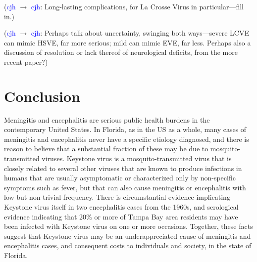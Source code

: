 \documentclass[12pt]{article}
\newcommand{\cjh}{\textcolor{blue}{cjh}}
\newcommand{\msg}[3]{(#1 $\rightarrow$ #2: #3)}
\newcommand{\mcc}[1]{\msg\cjh\cjh{#1}}
\begin{document}
            \mcc{Long-lasting complications, for La Crosse Virus in particular---fill in.}
            
            \mcc{Perhaps talk about uncertainty, swinging both ways---severe LCVE can mimic HSVE, far more serious; mild can mimic EVE, far less. Perhaps also a discussion of resolution or lack thereof of neurological deficits, from the more recent paper?}

    \section{Conclusion}
        \label{conclusion}
        Meningitis and encephalitis are serious public health burdens in the contemporary United States. In Florida, as in the US as a whole, many cases of meningitis and encephalitis never have a specific etiology diagnosed, and there is reason to believe that a substantial fraction of these may be due to mosquito-transmitted viruses. Keystone virus is a mosquito-transmitted virus that is closely related to several other viruses that are known to produce infections in humans that are usually asymptomatic or characterized only by non-specific symptoms such as fever, but that can also cause meningitis or encephalitis with low but non-trivial frequency. There is circumstantial evidence implicating Keystone virus itself in two encephalitis cases from the 1960s, and serological evidence indicating that 20\% or more of Tampa Bay area residents may have been infected with Keystone virus on one or more occasions. Together, these facts suggest that Keystone virus may be an underappreciated cause of meningitis and encephalitis cases, and consequent costs to individuals and society, in the state of Florida.

\end{document}
